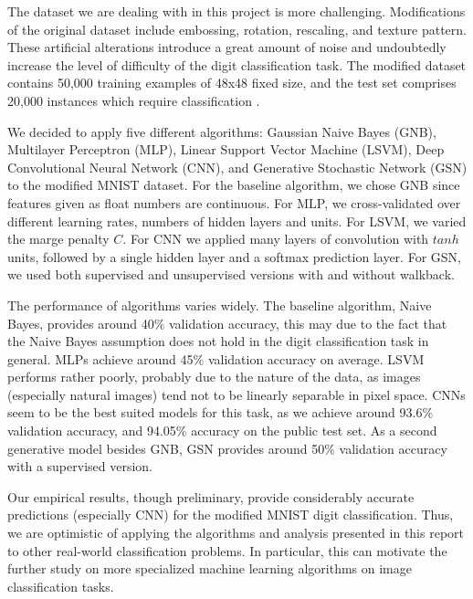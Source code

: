 \documentclass{acm_proc_article-sp}
\begin{document}
The dataset we are dealing with in this project is more challenging. Modifications of the original dataset include embossing, rotation, rescaling, and texture pattern. These artificial alterations introduce a great amount of noise and undoubtedly increase the  level of difficulty of the digit classification task. The modified dataset contains 50,000 training examples of 48x48 fixed size, and the test set comprises 20,000 instances which require classification \cite{comp598p3}.

We decided to apply five different algorithms: Gaussian Naive Bayes (GNB), Multilayer Perceptron (MLP), Linear Support Vector Machine (LSVM), Deep Convolutional Neural Network (CNN), and Generative Stochastic Network (GSN) to the modified MNIST dataset. For the baseline algorithm, we chose GNB since features given as float numbers are continuous. For MLP, we cross-validated over different learning rates, numbers of hidden layers and units. For LSVM, we varied the marge penalty $C$. For CNN we applied many layers of convolution with $tanh$ units, followed by a single hidden layer and a softmax prediction layer. For GSN, we used both supervised and unsupervised versions with and without walkback.

The performance of algorithms varies widely. The baseline algorithm, Naive Bayes, provides around 40$\%$ validation accuracy, this may due to the fact that the Naive Bayes assumption does not hold in the digit classification task in general. MLPs achieve around 45$\%$ validation accuracy on average. LSVM performs rather poorly, probably due to the nature of the data, as images (especially natural images) tend not to be linearly separable in pixel space. CNNs seem to be the best suited models for this task, as we achieve around 93.6$\%$ validation accuracy, and 94.05$\%$ accuracy on the public test set. As a second generative model besides GNB, GSN provides around 50$\%$ validation accuracy with a supervised version.

Our empirical results, though preliminary, provide considerably accurate predictions (especially CNN) for the modified MNIST digit classification. Thus, we are optimistic of applying the algorithms and analysis presented in this report to other real-world  classification problems. In particular, this can motivate the further study on more specialized machine learning algorithms on image classification tasks.




\end{document}
